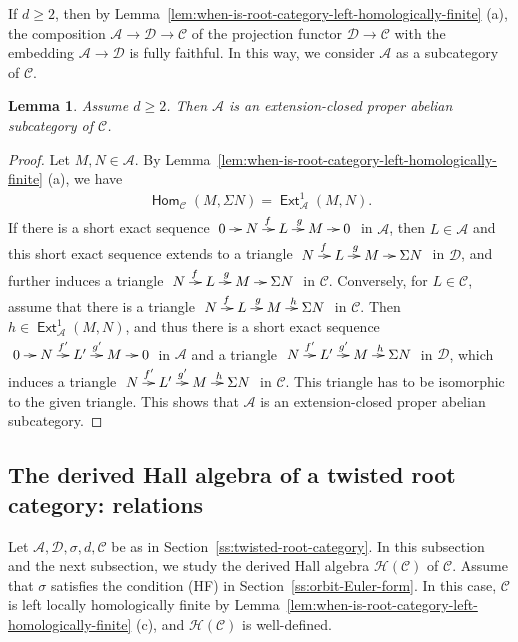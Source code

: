 \documentclass[reqno,12pt,a4paper]{amsart}
\newtheorem{lemma}[theorem]{Lemma}
\theoremstyle{remark}
\theoremstyle{definition}
\newcommand{\opname}[1]{\operatorname{\mathsf{#1}}}
\newcommand{\Hom}{\opname{Hom}}
\newcommand{\Ext}{\opname{Ext}}
\newcommand{\ca}{{\mathcal A}}
\newcommand{\cc}{{\mathcal C}}
\newcommand{\cd}{{\mathcal D}}
\newcommand{\ch}{{\mathcal H}}
\numberwithin{equation}{section}
\begin{document}
If $d\geq 2$, then by Lemma~\ref{lem:when-is-root-category-left-homologically-finite} (a), the composition $\ca\to\cd\to\cc$ of the projection functor $\cd\to\cc$ with the embedding $\ca\to\cd$ is fully faithful. In this way, we consider $\ca$ as a subcategory of $\cc$.

\begin{lemma}
\label{lem:A-proper-abelian}
Assume $d\geq 2$.
Then $\ca$ is an extension-closed proper abelian subcategory of $\cc$.
\end{lemma}
\begin{proof}
Let $M,N\in\ca$.
By Lemma~\ref{lem:when-is-root-category-left-homologically-finite} (a), we have
\begin{align*}
\Hom_\mathcal{C}(M,\Sigma N)=\Ext^1_\mathcal{A}(M,N).
\end{align*}
If there is a short exact sequence $\xymatrix@C=0.7pc{0\ar[r] & N\ar[r]^{f} & L\ar[r]^{g} & M\ar[r] & 0}$ in $\ca$, then $L\in\ca$ and this short exact sequence extends to a triangle $\xymatrix@C=0.7pc{N\ar[r]^{f} & L\ar[r]^{g} & M\ar[r] & \Sigma N}$ in $\cd$, and further induces a triangle $\xymatrix@C=0.7pc{N\ar[r]^{f} & L\ar[r]^{g} & M\ar[r] & \Sigma N}$ in $\cc$. Conversely,
for $L\in\cc$, assume that there is a triangle $\xymatrix@C=0.7pc{N\ar[r]^f & L\ar[r]^g & M\ar[r]^h & \Sigma N}$ in $\cc$. Then $h\in\Ext^1_\ca(M,N)$, and thus there is a short exact sequence $\xymatrix@C=0.7pc{0\ar[r] & N\ar[r]^{f'} & L'\ar[r]^{g'} & M\ar[r] & 0}$ in $\ca$ and a triangle $\xymatrix@C=0.7pc{N\ar[r]^{f'} & L'\ar[r]^{g'} & M\ar[r]^h & \Sigma N}$ in $\cd$, which induces a triangle $\xymatrix@C=0.7pc{N\ar[r]^{f'} & L'\ar[r]^{g'} & M\ar[r]^h & \Sigma N}$ in $\cc$. This triangle has to be isomorphic to the given triangle. This shows that $\ca$ is an extension-closed proper abelian subcategory.
\end{proof}

\subsection{The derived Hall algebra of a twisted root category: relations}
\label{ss:Hall-algebra-of-twisted-root-category-relations}

Let $\ca,\cd,\sigma,d,\cc$ be as in Section~\ref{ss:twisted-root-category}.
In this subsection and the next subsection, we study the derived Hall algebra $\ch(\cc)$ of $\cc$. Assume that $\sigma$ satisfies the condition (HF) in Section~\ref{ss:orbit-Euler-form}. In this case, $\cc$ is left locally homologically finite by Lemma~\ref{lem:when-is-root-category-left-homologically-finite} (c), and $\ch(\cc)$ is well-defined. 
\end{document}
